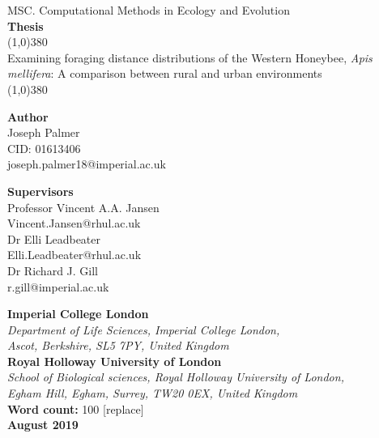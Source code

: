 \documentclass[11pt,usenames,dvipsnames]{article}
\begin{document}
\begin{titlepage}
\begin{center}
	\large{MSC. Computational Methods in Ecology and Evolution }\\
	\textbf{Thesis}\\[0cm]
	\huge{\line(1,0){380}\\
		Examining foraging distance distributions of the Western Honeybee, \textit{Apis mellifera}: A comparison between rural and urban environments\\
	\line(1,0){380}}\\[2cm]
\end{center}


\begin{minipage}[t]{0.5\textwidth}
\begin{flushleft}
	\Large{\textbf{Author}}\\
	\large{ Joseph Palmer\\
		CID: 01613406}\\
	joseph.palmer18@imperial.ac.uk\\[1cm]	
\end{flushleft}
\end{minipage}
\begin{minipage}[t]{0.5\textwidth}
\begin{flushright}
	\Large{\textbf{Supervisors}}\\
	\large{ Professor Vincent A.A. Jansen}\\
	Vincent.Jansen@rhul.ac.uk\\
	\large{Dr Elli Leadbeater}\\
	Elli.Leadbeater@rhul.ac.uk\\
	\large{Dr Richard J. Gill}\\
	r.gill@imperial.ac.uk
\end{flushright}
\end{minipage}

\vspace{1cm}
\begin{center}
	\large{\textbf{Imperial College London }}\\[0.2cm]
	\large{\textit{Department of Life Sciences, Imperial College London,}\\
		\textit{Ascot, Berkshire, SL5 7PY, United Kingdom}}\\[0.5cm]
	
	\large{\textbf{Royal Holloway University of London }}\\[0.2cm]
	\large{\textit{School of Biological sciences, Royal Holloway University of London,\\
			Egham Hill, Egham, Surrey, TW20 0EX, United Kingdom}}\\[0.5cm]
	\textbf{Word count:} 100 [replace]\\[0.5cm]
	\textbf{August 2019}
\end{center}

\end{titlepage}
\newpage
\tableofcontents
\newpage
\end{document}
